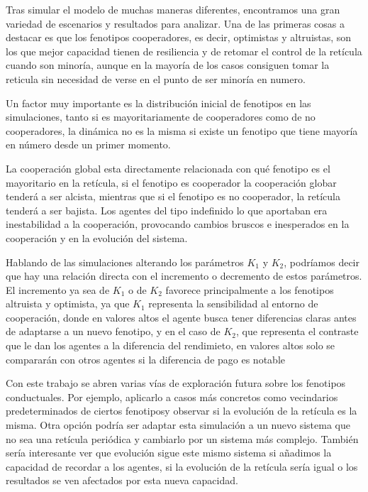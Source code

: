 \documentclass[a4paper,12pt]{report}
\begin{document}
Tras simular el modelo de muchas maneras diferentes, encontramos una gran variedad de escenarios y resultados para analizar. Una de las primeras cosas a destacar es que los fenotipos cooperadores, es decir, optimistas y altruistas, son los que mejor capacidad tienen de resiliencia y de retomar el control de la retícula cuando son minoría, aunque en la mayoría de los casos consiguen tomar la reticula sin necesidad de verse en el punto de ser minoría en numero.

Un factor muy importante es la distribución inicial de fenotipos en las simulaciones, tanto si es mayoritariamente de cooperadores como de no cooperadores, la dinámica no es la misma si existe un fenotipo que tiene mayoría en número desde un primer momento.

La cooperación global esta directamente relacionada con qué fenotipo es el mayoritario en la retícula, si el fenotipo es cooperador la cooperación globar tenderá a ser alcista, mientras que si el fenotipo es no cooperador, la retícula tenderá a ser bajista. Los agentes del tipo indefinido lo que aportaban era inestabilidad a la cooperación, provocando cambios bruscos e inesperados en la cooperación y en la evolución del sistema.

Hablando de las simulaciones alterando los parámetros \(K_1\) y \(K_2\), podríamos decir que hay una relación directa con el incremento o decremento de estos parámetros. El incremento ya sea de \(K_1\) o de \(K_2\) favorece principalmente a los fenotipos altruista y optimista, ya que \(K_1\) representa la sensibilidad al entorno de cooperación, donde en valores altos el agente busca tener diferencias claras antes de adaptarse a un nuevo fenotipo, y en el caso de \(K_2\), que representa el contraste que le dan los agentes a la diferencia del rendimieto, en valores altos solo se compararán con otros agentes si la diferencia de pago es notable 

Con este trabajo se abren varias vías de exploración futura sobre los fenotipos conductuales. Por ejemplo, aplicarlo a casos más concretos como vecindarios predeterminados de ciertos fenotiposy observar si la evolución de la retícula es la misma. Otra opción podría ser adaptar esta simulación a un nuevo sistema que no sea una retícula periódica y cambiarlo por un sistema más complejo. También sería interesante ver que evolución sigue este mismo sistema si añadimos la capacidad de recordar a los agentes, si la evolución de la retícula sería igual o los resultados se ven afectados por esta nueva capacidad.


\renewcommand{\bibname}{Bibliografía}
\printbibliography%
\end{document}
